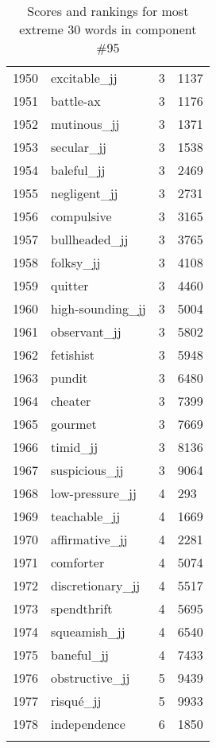 \begin{longtable}[!htbp]{| rlr@{.}l |}
    1950 & excitable\_jj & 3 & 1137 \\
    1951 & battle-ax & 3 & 1176 \\
    1952 & mutinous\_jj & 3 & 1371 \\
    1953 & secular\_jj & 3 & 1538 \\
    1954 & baleful\_jj & 3 & 2469 \\
    1955 & negligent\_jj & 3 & 2731 \\
    1956 & compulsive & 3 & 3165 \\
    1957 & bullheaded\_jj & 3 & 3765 \\
    1958 & folksy\_jj & 3 & 4108 \\
    1959 & quitter & 3 & 4460 \\
    1960 & high-sounding\_jj & 3 & 5004 \\
    1961 & observant\_jj & 3 & 5802 \\
    1962 & fetishist & 3 & 5948 \\
    1963 & pundit & 3 & 6480 \\
    1964 & cheater & 3 & 7399 \\
    1965 & gourmet & 3 & 7669 \\
    1966 & timid\_jj & 3 & 8136 \\
    1967 & suspicious\_jj & 3 & 9064 \\
    1968 & low-pressure\_jj & 4 & 293 \\
    1969 & teachable\_jj & 4 & 1669 \\
    1970 & affirmative\_jj & 4 & 2281 \\
    1971 & comforter & 4 & 5074 \\
    1972 & discretionary\_jj & 4 & 5517 \\
    1973 & spendthrift & 4 & 5695 \\
    1974 & squeamish\_jj & 4 & 6540 \\
    1975 & baneful\_jj & 4 & 7433 \\
    1976 & obstructive\_jj & 5 & 9439 \\
    1977 & risqué\_jj & 5 & 9933 \\
    1978 & independence & 6 & 1850 \\
    \hline
    \caption{Scores and rankings for most extreme 30 words in component \#95} \\
\end{longtable}
